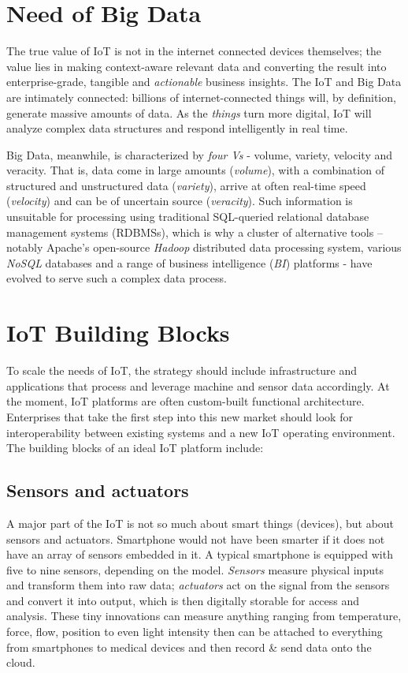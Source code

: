 \documentclass[sigconf]{acmart}
\begin{document}
\section{Need of Big Data}

The true value of IoT is not in the internet connected devices themselves; the value lies in making context-aware relevant data and converting the result into enterprise-grade, tangible and {\em actionable} business insights. The IoT and Big Data are intimately connected: billions of internet-connected things will, by definition, generate massive amounts of data. As the {\em things} turn more digital, IoT will analyze complex data structures and respond intelligently in real time. 

Big Data, meanwhile, is characterized by {\em four Vs} - volume, variety, velocity and veracity\cite{3wikibigdata}. That is, data come in large amounts ({\em volume}), with a combination of structured and unstructured data ({\em variety}), arrive at often real-time speed ({\em velocity}) and can be of uncertain source ({\em veracity}). Such information is unsuitable for processing using traditional SQL-queried relational database management systems (RDBMSs), which is why a cluster of alternative tools -- notably Apache's open-source {\em Hadoop} distributed data processing system, various {\em NoSQL} databases and a range of business intelligence ({\em BI}) platforms - have evolved to serve such a complex data process.


\section{IoT Building Blocks}

To scale the needs of IoT, the strategy should include infrastructure and applications that process and leverage machine and sensor data accordingly. At the moment, IoT platforms are often custom-built functional architecture. Enterprises that take the first step into this new market should look for interoperability between existing systems and a new IoT operating environment. The building blocks of an ideal IoT platform include:

\subsection{Sensors and actuators}
A major part of the IoT is not so much about smart things (devices), but about sensors and actuators. Smartphone would not have been smarter if it does not have an array of sensors embedded in it. A typical smartphone is equipped with five to nine sensors, depending on the model. {\em Sensors} measure physical inputs and transform them into raw data; {\em actuators} act on the signal from the sensors and convert it into output, which is then digitally storable for access and analysis.  These tiny innovations can measure anything ranging from temperature, force, flow, position to even light intensity then can be attached to everything from smartphones to medical devices and then record \& send data onto the cloud\cite{4WileyBook}. 
\end{document}
